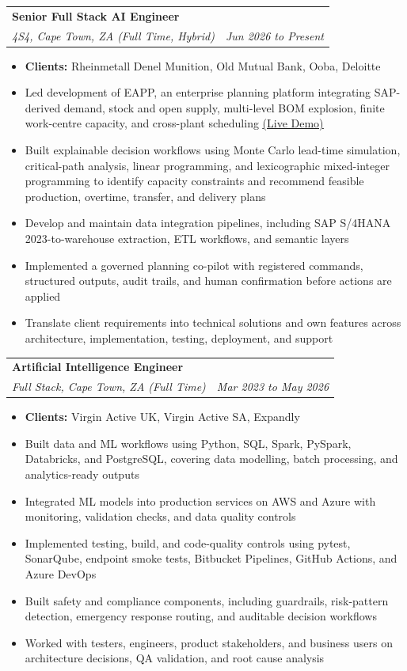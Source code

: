 \documentclass[letterpaper,11pt]{article}
\makeatletter
\newcommand{\resumeItem}[1]{
  \item\small{
    {#1 \vspace{-1pt}}
  }
}
\newcommand{\resumeSubheading}[4]{
  \vspace{-2pt}\item
    \begin{tabular*}{1.0\textwidth}[t]{l@{\extracolsep{\fill}}r}
      \textbf{\large#1} & \textbf{\small #2} \\
      \textit{\large#3} & \textit{\small #4} \\

    \end{tabular*}\vspace{-7pt}
}
\newcommand{\resumeItemListStart}{\begin{itemize}[leftmargin=0.1in]}
\newcommand{\resumeItemListEnd}{\end{itemize}\vspace{-5pt}}
\makeatother
\begin{document}
    \resumeSubheading
      {Senior Full Stack AI Engineer}{}
      {4S4, Cape Town, ZA (Full Time, Hybrid)}{Jun 2026 to Present}
      \resumeItemListStart
            \resumeItem{\normalsize{\textbf{Clients:} Rheinmetall Denel Munition, Old Mutual Bank, Ooba, Deloitte}}
            \resumeItem{\normalsize{Led development of EAPP, an enterprise planning platform integrating SAP-derived demand, stock and open supply, multi-level BOM explosion, finite work-centre capacity, and cross-plant scheduling \href{https://eapp-tiffany.nicemushroom-b9780b64.southafricanorth.azurecontainerapps.io/}{\color{blue}\underline{(Live Demo)}}}}
            \resumeItem{\normalsize{Built explainable decision workflows using Monte Carlo lead-time simulation, critical-path analysis, linear programming, and lexicographic mixed-integer programming to identify capacity constraints and recommend feasible production, overtime, transfer, and delivery plans}}
            \resumeItem{\normalsize{Develop and maintain data integration pipelines, including SAP S/4HANA 2023-to-warehouse extraction, ETL workflows, and semantic layers}}
            \resumeItem{\normalsize{Implemented a governed planning co-pilot with registered commands, structured outputs, audit trails, and human confirmation before actions are applied}}
            \resumeItem{\normalsize{Translate client requirements into technical solutions and own features across architecture, implementation, testing, deployment, and support}}
      \resumeItemListEnd
      \vspace{7pt}

    \resumeSubheading
      {Artificial Intelligence Engineer}{}
      {Full Stack, Cape Town, ZA (Full Time)}{Mar 2023 to May 2026}
      \resumeItemListStart
            \resumeItem{\normalsize{\textbf{Clients:} Virgin Active UK, Virgin Active SA, Expandly}}
            \resumeItem{\normalsize{Built data and ML workflows using Python, SQL, Spark, PySpark, Databricks, and PostgreSQL, covering data modelling, batch processing, and analytics-ready outputs}}
            \resumeItem{\normalsize{Integrated ML models into production services on AWS and Azure with monitoring, validation checks, and data quality controls}}
            \resumeItem{\normalsize{Implemented testing, build, and code-quality controls using pytest, SonarQube, endpoint smoke tests, Bitbucket Pipelines, GitHub Actions, and Azure DevOps}}
            \resumeItem{\normalsize{Built safety and compliance components, including guardrails, risk-pattern detection, emergency response routing, and auditable decision workflows}}
            \resumeItem{\normalsize{Worked with testers, engineers, product stakeholders, and business users on architecture decisions, QA validation, and root cause analysis}}
      \resumeItemListEnd
      \vspace{7pt}
\end{document}

